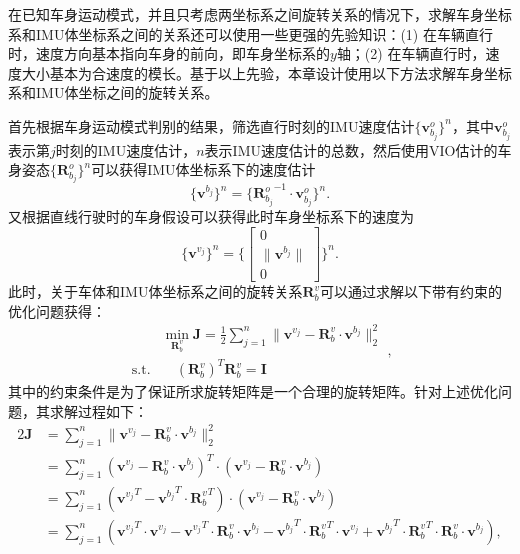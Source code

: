 在已知车身运动模式，并且只考虑两坐标系之间旋转关系的情况下，求解车身坐标系和IMU体坐标系之间的关系还可以使用一些更强的先验知识：(1) 在车辆直行时，速度方向基本指向车身的前向，即车身坐标系的$y$轴；(2) 在车辆直行时，速度大小基本为合速度的模长。基于以上先验，本章设计使用以下方法求解车身坐标系和IMU体坐标之间的旋转关系。

首先根据车身运动模式判别的结果，筛选直行时刻的IMU速度估计$\{\symbf{v}^o_{b_{j}}\}^n$，其中$\symbf{v}^o_{b_{j}}$表示第$j$时刻的IMU速度估计，$n$表示IMU速度估计的总数，然后使用VIO估计的车身姿态$\{ \symbf{R}_{b_{j}}^o\}^n$可以获得IMU体坐标系下的速度估计
\begin{equation}
  \{\symbf{v}^{b_{j}}\}^n = \{ {\symbf{R}_{b_{j}}^o}^{-1} \cdot \symbf{v}^o_{b_{j}} \}^n.
\end{equation}
又根据直线行驶时的车身假设可以获得此时车身坐标系下的速度为
\begin{equation}
  \{\symbf{v}^{v_{j}}\}^n = \{ \begin{bmatrix}
    0 \\
    \| \symbf{v}^{b_{j}} \| \\ 
    0
  \end{bmatrix}\}^n.
\end{equation}
此时，关于车体和IMU体坐标系之间的旋转关系$\symbf{R}_{b}^{v}$可以通过求解以下带有约束的优化问题获得：
\begin{equation}
\begin{aligned}
  &\min_{\symbf{R}_{b}^{v}} \symbf{J} = \frac{1}{2} \sum_{j=1}^{n} \| \symbf{v}^{v_{j}} - \symbf{R}_{b}^{v} \cdot \symbf{v}^{b_{j}} \|_2^2 \\
  \text{s.t.} & \quad {(\symbf{R}_{b}^{v})}^T \symbf{R}_{b}^{v} = \symbf{I}
\end{aligned},
\end{equation}
其中的约束条件是为了保证所求旋转矩阵是一个合理的旋转矩阵。针对上述优化问题，其求解过程如下：
\begin{align}
  2\symbf{J} &= \sum_{j=1}^{n} \| \symbf{v}^{v_{j}} - \symbf{R}_{b}^{v} \cdot \symbf{v}^{b_{j}} \|_2^2 \\ 
  &= \sum_{j=1}^{n} {(\symbf{v}^{v_{j}} - \symbf{R}_{b}^{v} \cdot \symbf{v}^{b_{j}})}^T \cdot {(\symbf{v}^{v_{j}} - \symbf{R}_{b}^{v} \cdot \symbf{v}^{b_{j}})} \\
  &= \sum_{j=1}^{n} {({\symbf{v}^{v_{j}}}^T - {\symbf{v}^{b_{j}}}^T \cdot {\symbf{R}_{b}^{v}}^T)} \cdot {(\symbf{v}^{v_{j}} - \symbf{R}_{b}^{v} \cdot \symbf{v}^{b_{j}})} \\
  &= \sum_{j=1}^{n} ({\symbf{v}^{v_{j}}}^T \cdot \symbf{v}^{v_{j}} - {\symbf{v}^{v_{j}}}^T \cdot \symbf{R}_{b}^{v} \cdot \symbf{v}^{b_{j}} - {\symbf{v}^{b_{j}}}^T \cdot {\symbf{R}_{b}^{v}}^T \cdot {\symbf{v}^{v_{j}}} + {\symbf{v}^{b_{j}}}^T \cdot {\symbf{R}_{b}^{v}}^T \cdot \symbf{R}_{b}^{v} \cdot \symbf{v}^{b_{j}}),
\end{align}

